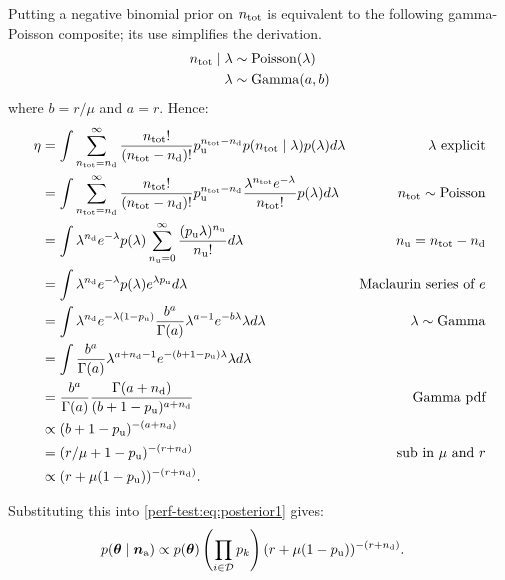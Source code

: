 \documentclass[thesis.tex]{subfiles}
\begin{document}
Putting a negative binomial prior on $n_\text{tot}$ is equivalent to the following gamma-Poisson composite; its use simplifies the derivation.
\begin{align}
n_\text{tot} \mid \lambda &\sim \operatorname{Poisson}(\lambda) \\
\lambda &\sim \operatorname{Gamma}(a, b)
\end{align}
where $b = r / \mu$ and $a = r$.
Hence:
\begin{align}
\eta
&= \int \sum_{n_\text{tot}=n_\text{d}}^\infty \frac{n_\text{tot}!}{(n_\text{tot}-n_\text{d})!} p_\text{u}^{n_\text{tot}-n_\text{d}} p(n_\text{tot} \mid \lambda) p(\lambda) d\lambda &\text{$\lambda$ explicit}\\
&= \int \sum_{n_\text{tot}=n_\text{d}}^\infty \frac{n_\text{tot}!}{(n_\text{tot}-n_\text{d})!} p_\text{u}^{n_\text{tot}-n_\text{d}} \frac{\lambda^{n_\text{tot}} e^{-\lambda}}{n_\text{tot}!} p(\lambda) d\lambda &n_\text{tot} \sim \operatorname{Poisson}\\
&= \int \lambda^{n_\text{d}} e^{-\lambda} p(\lambda) \sum_{n_\text{u}=0}^\infty \frac{(p_\text{u} \lambda)^{n_\text{u}}}{n_\text{u}!} d\lambda &n_\text{u} = n_\text{tot}-n_\text{d}\\
&= \int \lambda^{n_\text{d}} e^{-\lambda} p(\lambda) e^{\lambda p_\text{u}} d\lambda &\text{Maclaurin series of $e$} \\
&= \int \lambda^{n_\text{d}} e^{-\lambda(1 - p_\text{u})} \frac{b^a}{\Gamma(a)} \lambda^{a-1} e^{-b\lambda} \lambda d\lambda &\lambda \sim \operatorname{Gamma}\\
&= \int \frac{b^a}{\Gamma(a)} \lambda^{a+n_\text{d}-1} e^{-(b+1-p_\text{u})\lambda} \lambda d\lambda \\
&= \frac{b^a}{\Gamma(a)} \frac{\Gamma(a+n_\text{d})}{(b+1-p_\text{u})^{a+n_\text{d}}} &\text{Gamma pdf}\\
&\propto (b+1-p_\text{u})^{-(a+n_\text{d})} \\
&= (r/\mu + 1 - p_\text{u})^{-(r+n_\text{d})} &\text{sub in $\mu$ and $r$}\\
&\propto(r + \mu (1- p_\text{u}))^{-(r+n_\text{d})}.
\end{align}

Substituting this into \cref{perf-test:eq:posterior1} gives:
\begin{align}
p(\bm{\theta} \mid \bm{n}_\text{a})
&\propto p(\bm{\theta}) \left( \prod_{i \in \mathcal{D}} p_k \right) (r + \mu (1- p_\text{u}))^{-(r+n_\text{d})} \label{perf-test:eq:full-posterior}.
\end{align}
\end{document}
